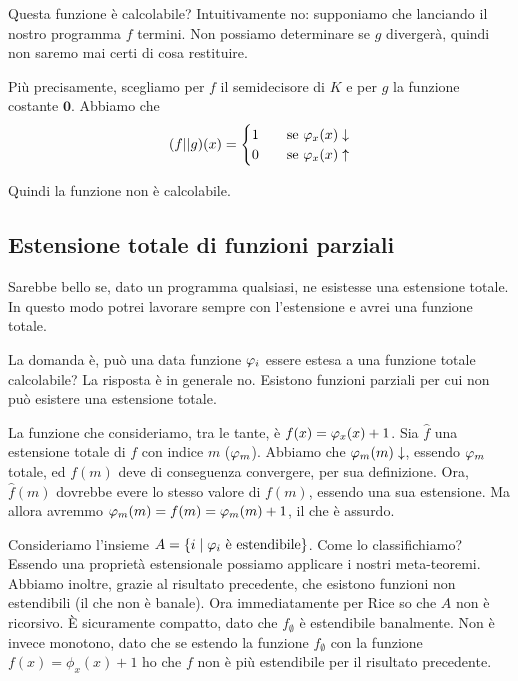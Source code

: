 Questa funzione è calcolabile? Intuitivamente no: supponiamo che lanciando il nostro programma $f$ 
termini. Non possiamo determinare se $g$ divergerà, quindi non saremo mai certi di cosa restituire.

Più precisamente, scegliamo per $f$ il semidecisore di $K$ e per $g$ la funzione costante $\bm{0}$.
Abbiamo che
\begin{equation*}
    (f || g)(x) =
    \begin{cases}
        1 \quad &\text{se $\varphi_{x}(x)\downarrow$}\\
        0 \quad &\text{se $\varphi_{x}(x)\uparrow$}\\
    \end{cases}
\end{equation*}

Quindi la funzione non è calcolabile.

\subsection{Estensione totale di funzioni parziali}

Sarebbe bello se, dato un programma qualsiasi, ne esistesse una estensione totale. In questo modo
potrei lavorare sempre con l'estensione e avrei una funzione totale.

La domanda è, può una data funzione $\varphi_{i}$ essere estesa a una funzione totale calcolabile? La
risposta è in generale no. Esistono funzioni parziali per cui non può esistere una estensione
totale.

La funzione che consideriamo, tra le tante, è $f(x) = \varphi_{x}(x) + 1$. Sia $\hat{f}$ una estensione
totale di $f$ con indice $m$ ($\varphi_{m}$). Abbiamo che $\varphi_{m}(m) \downarrow$, essendo $\varphi_{m}$ totale,
ed $f(m)$ deve di conseguenza convergere, per sua definizione. Ora, $\hat{f}(m)$ dovrebbe evere lo
stesso valore di $f(m)$, essendo una sua estensione. Ma allora avremmo $\varphi_{m}(m) = f(m) = \varphi_{m}(m) +
1$, il che è assurdo.

Consideriamo l'insieme $A = \{i \mid \varphi_{i} \text{ è estendibile}\}$. Come lo classifichiamo? Essendo una
proprietà estensionale possiamo applicare i nostri meta-teoremi. Abbiamo inoltre, grazie al
risultato precedente, che esistono funzioni non estendibili (il che non è banale). Ora
immediatamente per Rice so che $A$ non è ricorsivo. È sicuramente compatto, dato
che $f_{\emptyset}$ è estendibile banalmente. Non è invece monotono, dato che se estendo la funzione
$f_{\emptyset}$ con la funzione $f(x) = \phi_{x}(x) + 1$  ho che $f$ non è più estendibile per il
risultato precedente.

